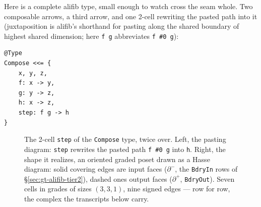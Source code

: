 Here is a complete alifib type, small enough to watch cross the seam
whole. Two composable arrows, a third arrow, and one 2-cell rewriting
the pasted path into it (juxtaposition is alifib's shorthand for
pasting along the shared boundary of highest shared dimension; here
\texttt{f g} abbreviates \texttt{f \#0 g}):

\begin{Verbatim}[fontsize=\small,frame=leftline,rulecolor=\color{accentmid},framesep=3mm,xleftmargin=3mm,samepage=true]
@Type
Compose <<= {
    x, y, z,
    f: x -> y,
    g: y -> z,
    h: x -> z,
    step: f g -> h
}
\end{Verbatim}

\begin{figure}[htbp]
\centering
{}
\hspace{14mm}
\caption{The 2-cell \texttt{step} of the \texttt{Compose} type, twice
over. Left, the pasting diagram: \texttt{step} rewrites the pasted
path \texttt{f \#0 g} into \texttt{h}. Right, the shape it realizes,
an oriented graded poset drawn as a Hasse diagram: solid covering
edges are input faces ($\partial^-$, the \texttt{BdryIn} rows of
\S\ref{sec:gt-alifib-tier2}), dashed ones output faces ($\partial^+$,
\texttt{BdryOut}). Seven cells in grades of sizes $(3,3,1)$, nine
signed edges --- row for row, the complex the transcripts below carry.}
\label{fig:gt-alifib-step}
\end{figure}

